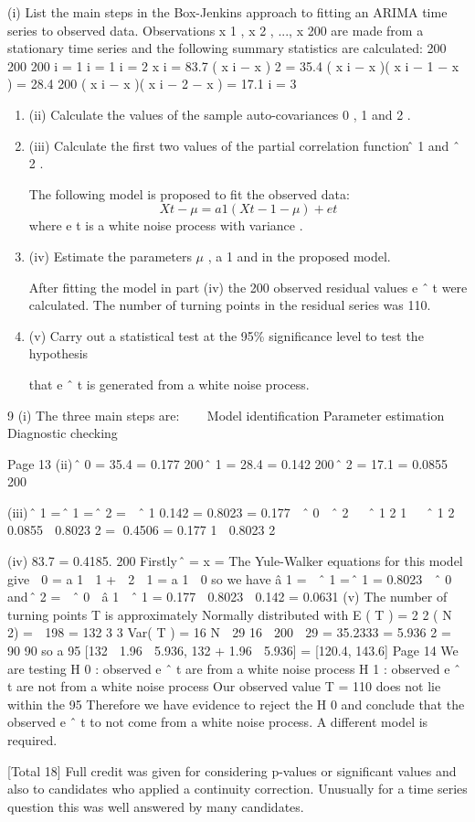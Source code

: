 \documentclass[a4paper,12pt]{article}
\begin{document}
(i)
List the main steps in the Box-Jenkins approach to fitting an ARIMA time
series to observed data.
\medskip 
Observations x 1 , x 2 , ..., x 200 are made from a stationary time series and the following
summary statistics are calculated:
200 200 200
i = 1 i = 1 i = 2
\sum  x i = 83.7
\sum  ( x i − x ) 2 = 35.4
\sum  ( x i − x )( x i − 1 − x ) = 28.4
200
\sum  ( x i − x )( x i − 2 − x ) = 17.1
i = 3
\begin{enumerate}
    \item 

(ii) Calculate the values of the sample auto-covariances \hat{\gamma} 0 , \hat{\gamma} 1 and \hat{\gamma} 2 .
\item (iii) Calculate the first two values of the partial correlation function \phi ̂ 1 and \phi  ˆ 2 .


The following model is proposed to fit the observed data:
\[X t − \mu  = a 1 (X t−1 − \mu ) + e t\]
where e t is a white noise process with variance  .
\item (iv)
Estimate the parameters $\mu$ , a 1 and  in the proposed model.

After fitting the model in part (iv) the 200 observed residual values e ˆ t were
calculated. The number of turning points in the residual series was 110.
\item (v)
Carry out a statistical test at the 95\% significance level to test the hypothesis

that e ˆ t is generated from a white noise process.
\end{enumerate}
\newpage 

9
(i)
The three main steps are:



Model identification
Parameter estimation
Diagnostic checking

Page 13%
(ii)
̂ 0 = 35.4
= 0.177
200
̂ 1 = 28.4
= 0.142
200
̂ 2 = 17.1
= 0.0855
200

(iii)
̂ 1 = ̂ 1 =
̂ 2 =
 ˆ 1
0.142
= 0.8023
=
0.177
 ˆ 0
 ˆ 2   ˆ 1 2
1   ˆ 1 2
0.0855
 0.8023 2
= 0.4506
= 0.177
1  0.8023 2

(iv)
83.7
= 0.4185.
200
Firstly ̂ = x =
The Yule-Walker equations for this model give
 0 = a 1  1 +  2
 1 = a 1  0
so we have â 1 =
 ˆ 1
= ̂ 1 = 0.8023
 ˆ 0
and ̂ 2 =  ˆ 0  â 1  ˆ 1 = 0.177  0.8023  0.142 = 0.0631
(v)
The number of turning points T is approximately Normally distributed with
E ( T ) =
2
2
( N  2) =  198 = 132
3
3
Var( T ) =
16 N  29 16  200  29
= 35.2333 = 5.936 2
=
90
90
so a 95%
[132  1.96  5.936, 132 + 1.96  5.936] = [120.4, 143.6]
Page 14
We are testing
H 0 : observed e ˆ t are from a white noise process
H 1 : observed e ˆ t are not from a white noise process
Our observed value T = 110 does not lie within the 95%
Therefore we have evidence to reject the H 0 and conclude that the observed e ˆ t
to not come from a white noise process.
A different model is required.

[Total 18]
Full credit was given for considering p-values or significant values and also to candidates
who applied a continuity correction.
Unusually for a time series question this was well answered by many candidates.
\end{document}
